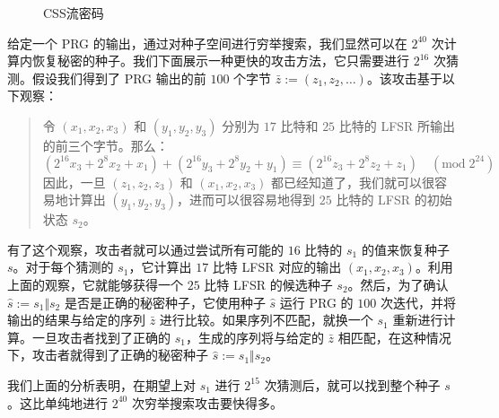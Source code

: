 \begin{figure}
	\centering
	
	\caption{CSS流密码}
	\label{fig:3-11}
\end{figure}

\begin{snote}[CSS的不安全性。]
给定一个 PRG 的输出，通过对种子空间进行穷举搜索，我们显然可以在 $2^{40}$ 次计算内恢复秘密的种子。我们下面展示一种更快的攻击方法，它只需要进行 $2^{16}$ 次猜测。假设我们得到了 PRG 输出的前 $100$ 个字节 $\bar{z}:=(z_1,z_2,\dots)$。该攻击基于以下观察：
\begin{quote}
令 $(x_1,x_2,x_3)$ 和 $(y_1,y_2,y_3)$ 分别为 $17$ 比特和 $25$ 比特的 LFSR 所输出的前三个字节。那么：
\[
(2^{16}x_3+2^8x_2+x_1)+(2^{16}y_3+2^8y_2+y_1)\equiv(2^{16}z_3+2^8z_2+z_1)\quad(\mathrm{mod}\;2^{24})
\]
因此，一旦 $(z_1,z_2,z_3)$ 和 $(x_1,x_2,x_3)$ 都已经知道了，我们就可以很容易地计算出 $(y_1,y_2,y_3)$，进而可以很容易地得到 $25$ 比特的 LFSR 的初始状态 $s_2$。
\end{quote}
有了这个观察，攻击者就可以通过尝试所有可能的 $16$ 比特的 $s_1$ 的值来恢复种子 $s$。对于每个猜测的 $s_1$，它计算出 $17$ 比特 LFSR 对应的输出 $(x_1,x_2,x_3)$。利用上面的观察，它就能够获得一个 $25$ 比特 LFSR 的候选种子 $s_2$。然后，为了确认 $\hat{s}:=s_1\Vert s_2$ 是否是正确的秘密种子，它使用种子 $\hat{s}$ 运行 PRG 的 $100$ 次迭代，并将输出的结果与给定的序列 $\bar{z}$ 进行比较。如果序列不匹配，就换一个 $s_1$ 重新进行计算。一旦攻击者找到了正确的 $s_1$，生成的序列将与给定的 $\bar{z}$ 相匹配，在这种情况下，攻击者就得到了正确的秘密种子 $\hat{s}:=s_1\Vert s_2$。

我们上面的分析表明，在期望上对 $s_1$ 进行 $2^{15}$ 次猜测后，就可以找到整个种子 $s$。这比单纯地进行 $2^{40}$ 次穷举搜索攻击要快得多。
\end{snote}